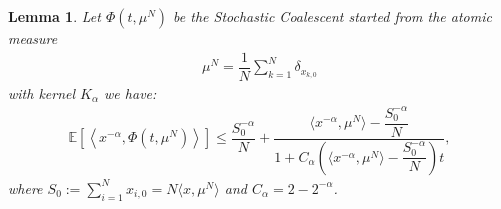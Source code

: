 \documentclass[11pt,a4paper]{article}
\newcommand{\E}[1]{\mathbb{E}\left[#1\right]}
\newtheorem{lemma}[theorem]{Lemma}
\begin{document}
\begin{lemma}
    Let $\Phi(t,\mu^N)$ be the Stochastic Coalescent started from the atomic measure 
    \begin{align*}
        \mu^N = \dfrac{1}{N}\sum\limits_{k = 1}^N \delta_{x_{k,0}}
    \end{align*}
    with kernel $K_\alpha$ we have:
    \begin{align*}
        \E{\left\langle x^{-\alpha},\Phi(t,\mu^N)\right\rangle} \leq \dfrac{S_0^{-\alpha}}{N} + \dfrac{\langle x^{-\alpha},\mu^N \rangle - \dfrac{S_0^{-\alpha}}{N}}{1 + C_\alpha \left(\langle x^{-\alpha},\mu^N \rangle - \dfrac{S_0^{-\alpha}}{N}\right)t},
    \end{align*}
    where $S_0 := \sum\limits_{i = 1}^N x_{i,0} = N\langle x,\mu^N\rangle$ and $C_\alpha = 2 - 2^{-\alpha}$.
\end{lemma}
\end{document}
